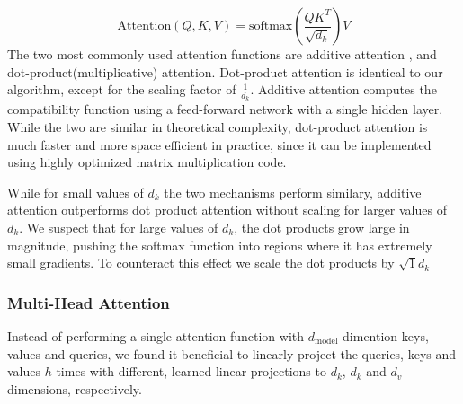 \documentclass{article}
\begin{document}
\begin{equation}
\mathrm{Attention}\left(Q,K,V\right)=\mathrm{softmax}\left(\frac{QK^T}{\sqrt{d_k}}\right)V
\end{equation}
The two most commonly used attention functions are additive attention \cite{2}, and dot-product(multiplicative) attention.
Dot-product attention is identical to our algorithm, except for the scaling factor of $\frac{1}{d_k}$.
Additive attention computes the compatibility function using a feed-forward network with a single hidden layer.
While the two are similar in theoretical complexity, dot-product attention is much faster and more space efficient in practice, since it can be implemented using highly optimized matrix multiplication code.

While for small values of $d_k$ the two mechanisms perform similary, additive attention outperforms dot product attention without scaling for larger values of $d_k$\cite{3}. 
We suspect that for large values of $d_k$, the dot products grow large in magnitude, pushing the softmax function into regions where it has extremely small gradients. To counteract this effect we scale the dot products by $\sqrt{1}{d_k}$

\subsubsection{Multi-Head Attention}

Instead of performing a single attention function with $d_\mathrm{model}$-dimention keys, values and queries, we found it beneficial to linearly project the queries, keys and values $h$ times with different, learned linear projections to $d_k$, $d_k$ and $d_v$ dimensions, respectively.
\end{document}
